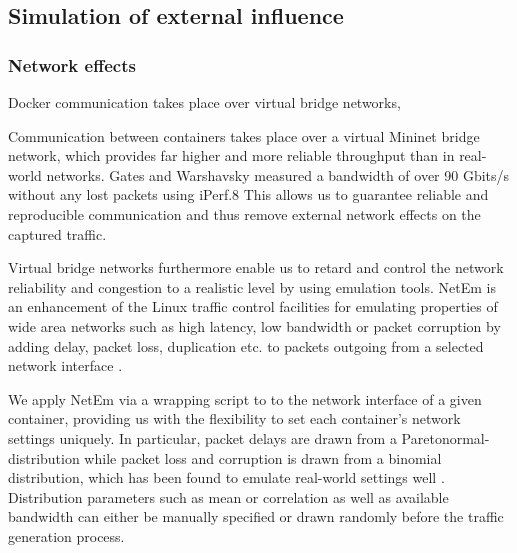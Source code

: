 \documentclass[sigconf]{acmart}
\begin{document}



\subsection{Simulation of external influence}

\subsubsection*{Network effects}

Docker communication takes place over virtual bridge networks, 

Communication between containers takes place over a virtual Mininet bridge network, which provides far higher and more reliable throughput than in real-world networks. Gates and Warshavsky \cite{iperf} measured a bandwidth of over 90 Gbits/s without any lost packets using iPerf.8 This allows us to guarantee reliable and reproducible communication and thus remove external network effects on the captured traffic.

Virtual bridge networks furthermore enable us to retard and control the network reliability and congestion to a realistic level by using emulation tools. NetEm is an enhancement of the Linux traffic control facilities for emulating properties of wide area networks such as high latency, low bandwidth or packet corruption by adding delay, packet loss, duplication etc. to packets outgoing from a selected network interface \cite{hemminger2005network}.

We apply NetEm via a wrapping script to to the network interface of a given container, providing us with the flexibility to set each container's network settings uniquely. In particular, packet delays are drawn from a Paretonormal-distribution while packet loss and corruption is drawn from a binomial distribution, which has been found to emulate real-world settings well \cite{jurgelionis2011empirical}. Distribution parameters such as mean or correlation as well as available bandwidth can either be manually specified or drawn randomly before the traffic generation process.

\end{document}
